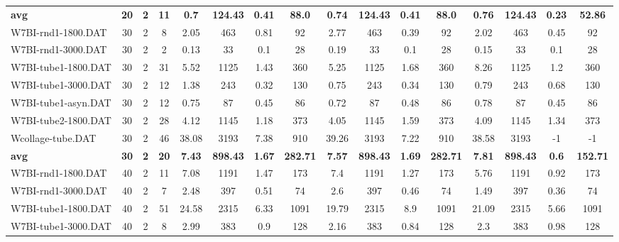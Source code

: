 \begin{sidewaystable}[!ht]
{\begin{tabular}{lccccccccccccccc}
\cline{1-16} \textbf{avg} & \textbf{20} & \textbf{2} & \textbf{11} & \textbf{0.7} & \textbf{124.43} & \textbf{0.41} & \textbf{88.0} & \textbf{0.74} & \textbf{124.43} & \textbf{0.41} & \textbf{88.0} & \textbf{0.76} & \textbf{124.43} & \textbf{0.23} & \textbf{52.86} \\ \cline{1-16}
W7BI-rnd1-1800.DAT & 30 & 2 & 8 & 2.05 & 463 & 0.81 & 92 & 2.77 & 463 &  \textcolor{blue2}{0.39} & 92 & 2.02 & 463 & 0.45 & 92 \\
W7BI-rnd1-3000.DAT & 30 & 2 & 2 & 0.13 & 33 &  \textcolor{blue2}{0.1} & 28 & 0.19 & 33 &  \textcolor{blue2}{0.1} & 28 & 0.15 & 33 &  \textcolor{blue2}{0.1} & 28 \\
W7BI-tube1-1800.DAT & 30 & 2 & 31 & 5.52 & 1125 & 1.43 & 360 & 5.25 & 1125 & 1.68 & 360 & 8.26 & 1125 &  \textcolor{blue2}{1.2} & 360 \\
W7BI-tube1-3000.DAT & 30 & 2 & 12 & 1.38 & 243 &  \textcolor{blue2}{0.32} & 130 & 0.75 & 243 & 0.34 & 130 & 0.79 & 243 & 0.68 & 130 \\
W7BI-tube1-asyn.DAT & 30 & 2 & 12 & 0.75 & 87 &  \textcolor{blue2}{0.45} & 86 & 0.72 & 87 & 0.48 & 86 & 0.78 & 87 &  \textcolor{blue2}{0.45} & 86 \\
W7BI-tube2-1800.DAT & 30 & 2 & 28 & 4.12 & 1145 &  \textcolor{blue2}{1.18} & 373 & 4.05 & 1145 & 1.59 & 373 & 4.09 & 1145 & 1.34 & 373 \\
Wcollage-tube.DAT & 30 & 2 & 46 & 38.08 & 3193 & 7.38 & 910 & 39.26 & 3193 &  \textcolor{blue2}{7.22} & 910 & 38.58 & 3193 & -1 & -1 \\
\cline{1-16} \textbf{avg} & \textbf{30} & \textbf{2} & \textbf{20} & \textbf{7.43} & \textbf{898.43} & \textbf{1.67} & \textbf{282.71} & \textbf{7.57} & \textbf{898.43} & \textbf{1.69} & \textbf{282.71} & \textbf{7.81} & \textbf{898.43} & \textbf{0.6} & \textbf{152.71} \\ \cline{1-16}
W7BI-rnd1-1800.DAT & 40 & 2 & 11 & 7.08 & 1191 & 1.47 & 173 & 7.4 & 1191 & 1.27 & 173 & 5.76 & 1191 &  \textcolor{blue2}{0.92} & 173 \\
W7BI-rnd1-3000.DAT & 40 & 2 & 7 & 2.48 & 397 & 0.51 & 74 & 2.6 & 397 & 0.46 & 74 & 1.49 & 397 &  \textcolor{blue2}{0.36} & 74 \\
W7BI-tube1-1800.DAT & 40 & 2 & 51 & 24.58 & 2315 & 6.33 & 1091 & 19.79 & 2315 & 8.9 & 1091 & 21.09 & 2315 &  \textcolor{blue2}{5.66} & 1091 \\
W7BI-tube1-3000.DAT & 40 & 2 & 8 & 2.99 & 383 & 0.9 & 128 & 2.16 & 383 &  \textcolor{blue2}{0.84} & 128 & 2.3 & 383 & 0.98 & 128 \\

\end{tabular}}
\end{sidewaystable}
